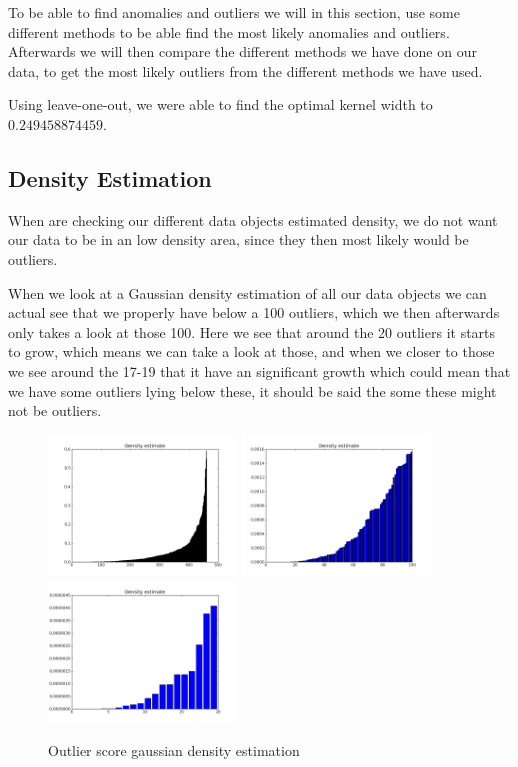 To be able to find anomalies and outliers we will in this section, use some different methods to be able find the most likely anomalies and outliers. Afterwards we will then compare the different methods we have done on our data, to get the most likely outliers from the different methods we have used.

Using leave-one-out, we were able to find the optimal kernel width to $0.249458874459$.

\subsection{Density Estimation}

When are checking our different data objects estimated density, we do not want our data to be in an low density area, since they then most likely would be outliers.

When we look at a Gaussian density estimation of all our data objects we can actual see that we properly have below a 100 outliers, which we then afterwards only takes a look at those 100. Here we see that around the 20 outliers it starts to grow, which means we can take a look at those, and when we closer to those we see around the 17-19 that it have an significant growth which could mean that we have some outliers lying below these, it should be said the some these might not be outliers.

\begin{figure}[H]
\centering
\includegraphics[width=5cm, keepaspectratio=true]{pictures/densityEstimationAll.png}
\includegraphics[width=5cm, keepaspectratio=true]{pictures/densityEstimation100.png}
\includegraphics[width=5cm, keepaspectratio=true]{pictures/densityEstimation20.png}
\vspace{-0.4cm}
\caption{\footnotesize Outlier score gaussian density estimation}
\label{gkd}
\end{figure}


